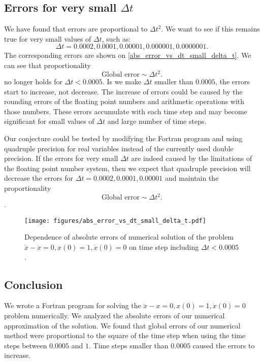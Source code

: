 \subsection{Errors for very small $\Delta t$}

We have found that errors are proportional to $\Delta t^2$. We want to see if this remains true for very small values of $\Delta t$, such as:
\[
  \Delta t = 0.0002, 0.0001, 0.00001, 0.000001, 0.0000001.
\]
The corresponding errors are shown on \autoref{abs_error_vs_dt_small_delta_t}. We can see that proportionality
\[
  \textrm{Global error} \sim \Delta t^2.
\]
no longer holds for $\Delta t < 0.0005$. Is we make $\Delta t$ smaller than $0.0005$, the errors start to increase, not decrease. The increase of errors could be caused by the rounding errors of the floating point numbers and arithmetic operations with those numbers. These errors accumulate with each time step and may become significant for small values of $\Delta t$ and large number of time steps.

Our conjecture could be tested by modifying the Fortran program and using quadruple precision for real variables instead of the currently used double precision. If the errors for very small $\Delta t$ are indeed caused by the limitations of the floating point number system, then we expect that quadruple precision will decrease the errors for $\Delta t = 0.0002, 0.0001, 0.00001$ and maintain the proportionality
\[
  \textrm{Global error} \sim \Delta t^2.
\].
\begin{figure}[H]
  \centering
  \texttt{[image: figures/abs\_error\_vs\_dt\_small\_delta\_t.pdf]}
  \caption{Dependence of absolute errors of numerical solution of the problem $\ddot{x} - x = 0, x(0)=1, \dot{x}(0)=0$ on time step including $\Delta t < 0.0005$.}
  \label{abs_error_vs_dt_small_delta_t}
\end{figure}



\subsection{Conclusion}

We wrote a Fortran program for solving the $\ddot{x} - x = 0, x(0)=1, \dot{x}(0)=0$ problem numerically. We analyzed the absolute errors of our numerical approximation of the solution. We found that global errors of our numerical method were proportional to the square of the time step when using the time steps between $0.0005$ and $1$. Time steps smaller than $0.0005$ caused the errors to increase.
